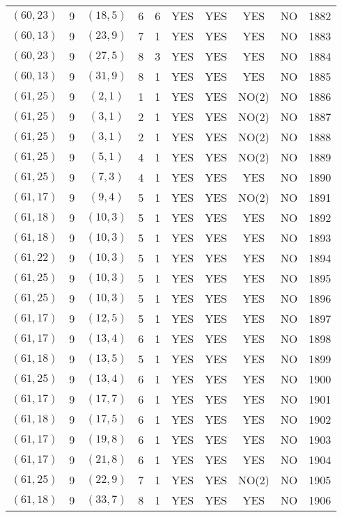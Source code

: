 \begin{longtable}{|c|c|c|c|c|c|c|c|c|c|}
$(60, 23)$ & 9 & $(18, 5)$ & 6 & 6 & YES & YES & YES & NO & 1882\\
$(60, 13)$ & 9 & $(23, 9)$ & 7 & 1 & YES & YES & YES & NO & 1883\\
$(60, 23)$ & 9 & $(27, 5)$ & 8 & 3 & YES & YES & YES & NO & 1884\\
$(60, 13)$ & 9 & $(31, 9)$ & 8 & 1 & YES & YES & YES & NO & 1885\\
$(61, 25)$ & 9 & $(2, 1)$ & 1 & 1 & YES & YES & NO(2) & NO & 1886\\
$(61, 25)$ & 9 & $(3, 1)$ & 2 & 1 & YES & YES & NO(2) & NO & 1887\\
$(61, 25)$ & 9 & $(3, 1)$ & 2 & 1 & YES & YES & NO(2) & NO & 1888\\
$(61, 25)$ & 9 & $(5, 1)$ & 4 & 1 & YES & YES & NO(2) & NO & 1889\\
$(61, 25)$ & 9 & $(7, 3)$ & 4 & 1 & YES & YES & YES & NO & 1890\\
$(61, 17)$ & 9 & $(9, 4)$ & 5 & 1 & YES & YES & NO(2) & NO & 1891\\
$(61, 18)$ & 9 & $(10, 3)$ & 5 & 1 & YES & YES & YES & NO & 1892\\
$(61, 18)$ & 9 & $(10, 3)$ & 5 & 1 & YES & YES & YES & NO & 1893\\
$(61, 22)$ & 9 & $(10, 3)$ & 5 & 1 & YES & YES & YES & NO & 1894\\
$(61, 25)$ & 9 & $(10, 3)$ & 5 & 1 & YES & YES & YES & NO & 1895\\
$(61, 25)$ & 9 & $(10, 3)$ & 5 & 1 & YES & YES & YES & NO & 1896\\
$(61, 17)$ & 9 & $(12, 5)$ & 5 & 1 & YES & YES & YES & NO & 1897\\
$(61, 17)$ & 9 & $(13, 4)$ & 6 & 1 & YES & YES & YES & NO & 1898\\
$(61, 18)$ & 9 & $(13, 5)$ & 5 & 1 & YES & YES & YES & NO & 1899\\
$(61, 25)$ & 9 & $(13, 4)$ & 6 & 1 & YES & YES & YES & NO & 1900\\
$(61, 17)$ & 9 & $(17, 7)$ & 6 & 1 & YES & YES & YES & NO & 1901\\
$(61, 18)$ & 9 & $(17, 5)$ & 6 & 1 & YES & YES & YES & NO & 1902\\
$(61, 17)$ & 9 & $(19, 8)$ & 6 & 1 & YES & YES & YES & NO & 1903\\
$(61, 17)$ & 9 & $(21, 8)$ & 6 & 1 & YES & YES & YES & NO & 1904\\
$(61, 25)$ & 9 & $(22, 9)$ & 7 & 1 & YES & YES & NO(2) & NO & 1905\\
$(61, 18)$ & 9 & $(33, 7)$ & 8 & 1 & YES & YES & YES & NO & 1906\\

\end{longtable}
